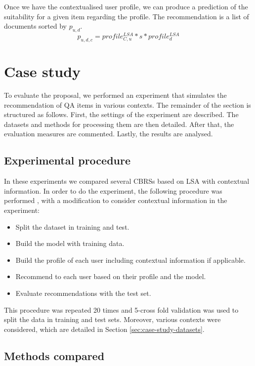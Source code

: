 \documentclass[preprint]{elsarticle}
\begin{document}
\begin{spacing}{1.5}
Once we have the contextualised user profile, we can produce a prediction of the suitability for a given item regarding the profile. The recommendation is a list of documents sorted by $p_{u,d}$.\begin{equation}
	p_{u,d,c} = profile^{LSA}_{C,u}*s*profile^{LSA}_d
\end{equation}

\section{Case study}
\label{sec:case-study}

To evaluate the proposal, we performed an experiment that simulates the recommendation of QA items in various contexts. The remainder of the section is structured as follows. First, the settings of the experiment are described. The datasets and methods for processing them are then detailed. After that, the evaluation measures are commented. Lastly, the results are analysed.

\subsection{Experimental procedure}

In these experiments we compared several CBRSs based on LSA with contextual information. In order to do the experiment, the following procedure was performed \cite{Sarwar2001}, with a modification to consider contextual information in the experiment:
\begin{itemize}
	\item Split the dataset in training and test.
	\item Build the model with training data.
	\item Build the profile of each user including contextual information if applicable.
	\item Recommend to each user based on their profile and the model.
	\item Evaluate recommendations with the test set.
\end{itemize}

This procedure was repeated 20 times and 5-cross fold validation was used to split the data in training and test sets. Moreover, various contexts were considered, which are detailed in Section \ref{sec:case-study-datasets}.

\subsection{Methods compared}


\end{spacing}
\end{document}

